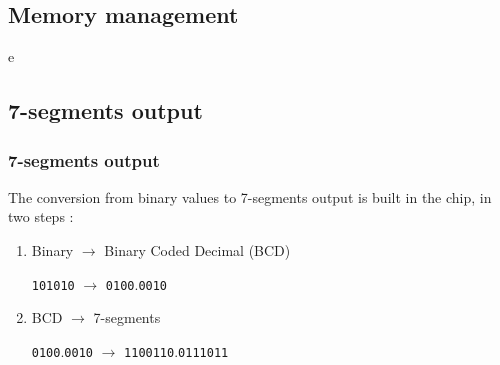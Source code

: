 \documentclass{beamer}
\begin{document}
\subsection{Memory management}

\begin{frame}
e
\end{frame}

\subsection{7-segments output}

\begin{frame}
\frametitle{7-segments output}
The conversion from binary values to 7-segments output is built in the chip, in two steps :
\begin{enumerate}
    \item Binary $\rightarrow$ Binary Coded Decimal (BCD)
        
          \texttt{101010} $\rightarrow$ \texttt{0100}.\texttt{0010}
    \item BCD $\rightarrow$ 7-segments

        \texttt{0100}.\texttt{0010} $\rightarrow$ \texttt{1100110}.\texttt{0111011}
\end{enumerate}
\end{frame}
\end{document}
